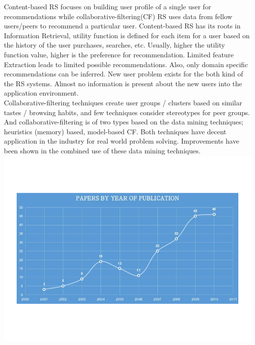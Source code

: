 \documentclass[12pt,a4paper]{article}
\begin{document}
Content-based RS focuses on building user profile of a single user for recommendations while collaborative-filtering(CF) RS uses data from fellow users/peers to recommend a particular user. Content-based RS has its roots in Information Retrieval, utility function is defined for each item for a user based on the history of the user purchases, searches, etc. Usually, higher the utility function value, higher is the preference for recommendation. Limited feature Extraction leads to limited possible recommendations. Also, only domain specific recommendations can be inferred. New user problem exists for the both kind of the RS systems. Almost no information is present about the new users into the application environment.\\

Collaborative-filtering techniques create user groups / clusters based on similar tastes / browsing habits, and few techniques consider stereotypes for peer groups. And collaborative-filtering is of two types based on the data mining techniques; heuristics (memory) based, model-based CF. Both techniques have decent application in the industry for real world problem solving. Improvements have been shown in the combined use of these data mining techniques.\\

\includegraphics[width=\linewidth]{images/Untitled}\\
\end{document}
